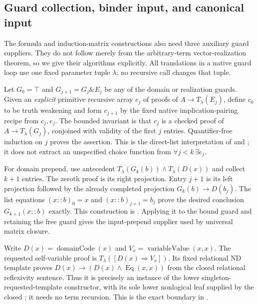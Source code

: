 \subsection{Guard collection, binder input, and canonical input}
\label{sec:term-guard-auxiliaries}

The formula and induction-matrix constructions also need three auxiliary
guard suppliers.  They do not follow merely from the arbitrary-term
vector-realization theorem, so we give their algorithms explicitly.
All translations in a native guard loop use one fixed parameter tuple
$\lambda$; no recursive call changes that tuple.

Let $G_0=\top$ and $G_{j+1}=G_j\mathbin\&E_j$ be any of the
domain or realization guards.  Given an \emph{explicit} primitive
recursive array $e_j$ of proofs of $A\to T_\lambda(E_j)$, define
$c_0$ to be truth weakening and form $c_{j+1}$ by the fixed native
implication-pairing recipe from $c_j,e_j$.  The bounded invariant is
that $c_j$ is a checked proof of $A\to T_\lambda(G_j)$, conjoined
with validity of the first $j$ entries.  Quantifier-free induction on
$j$ proves the assertion.  This is the direct-list interpretation of
 and
; it does not
extract an unspecified choice function from
$\forall j<k\,\exists e_j$.

For domain prepend, use antecedent
$T_\lambda(G_k(b))\wedge T_\lambda(D(x))$ and collect $k+1$
entries.  The zeroth proof is its right projection.  Entry $j+1$
is its left projection followed by the already completed projection
$G_k(b)\to D(b_j)$.  The list equations
$(x::b)_0=x$ and $(x::b)_{j+1}=b_j$ prove the desired conclusion
$G_{k+1}(x::b)$ exactly.  This construction is
.
Applying it to the bound guard and retaining the free guard gives
the input-prepend supplier used by universal matrix closure.

Write $D(x)=\operatorname{domainCode}(x)$ and
$V_x=\operatorname{variableValue}(x,x)$.
The requested self-variable proof is
$T_\lambda([D(x)\Rightarrow V_x])$.
Its fixed relational ND template proves
$D(x)\to(D(x)\wedge\operatorname{Eq}(x,x))$ from the
closed relational reflexivity sentence.  Thus it is precisely an
instance of the lower singleton-requested-template constructor,
with its sole lower nonlogical leaf supplied by the closed
; it needs no term recursion.
This is the exact boundary in
.

